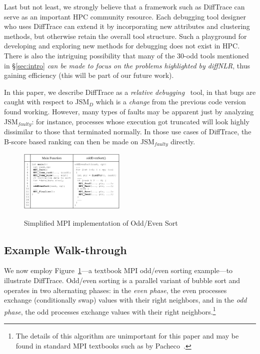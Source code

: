 Last but not least,
we strongly believe that a framework such as DiffTrace can
serve as an important HPC community resource.
%
Each debugging tool designer who uses DiffTrace can extend
it by incorporating new attributes and clustering methods, but
otherwise retain the overall tool structure.
%
Such a playground for developing and exploring new methods for
debugging does not exist in HPC.
%
There is also the intriguing possibility that 
many of the 30-odd tools mentioned in \S\ref{sec:intro}
{\em can be made to focus on the problems highlighted
  by diffNLR}, thus gaining efficiency (this will be part of our future work).


In this paper, we describe DiffTrace as a
{\em relative debugging}~\cite{cray-rel-debug}
tool, in that bugs are caught with respect
to JSM$_{D}$ which is a {\em change} from
the previous code version found working.
%
However, many types of faults may be apparent
just by analyzing JSM$_{faulty}$: for instance,
processes whose execution got truncated 
will look highly dissimilar to those that
terminated normally.
%
In those use cases of DiffTrace,
the B-score based ranking can then be made
on JSM$_{faulty}$ directly.





\begin{figure}[]
\centering
\caption{Simplified MPI implementation of Odd/Even Sort}
\includegraphics[width=0.45\textwidth]{figs/oddEven.png}
\label{fig.oddEven}
\end{figure}


\subsection{Example Walk-through}

We now employ
Figure~\ref{fig.oddEven}---a textbook MPI odd/even sorting example---to
illustrate DiffTrace.
%
Odd/even sorting is a parallel variant
of bubble sort
and operates in two alternating phases:
in the \textit{even phase}, the even processes exchange (conditionally swap)
values with their right neighbors, and in the \textit{odd phase},
the odd processes exchange values with their right neighbors.\footnote{The
  details of this algorithm are unimportant for this paper and may be
  found in standard MPI textbooks such as by Pacheco~\cite{pacheco}.}
%

